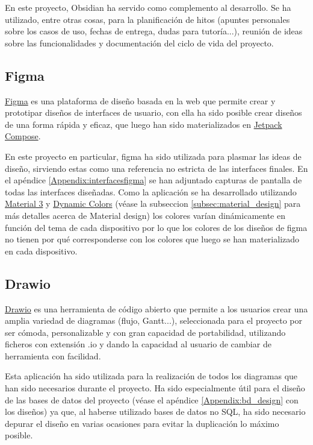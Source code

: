 En este proyecto, Obsidian ha servido como complemento al desarrollo. Se ha utilizado, entre otras cosas, para la planificación de hitos (apuntes personales sobre los casos de uso, fechas de entrega, dudas para tutoría...), reunión de ideas sobre las funcionalidades y documentación del ciclo de vida del proyecto.

\hypertarget{subsec:figma}{}
\subsection{Figma}
\href{https://www.figma.com}{Figma} es una plataforma de diseño basada en la web que permite crear y prototipar diseños de interfaces de usuario, con ella ha sido posible crear diseños de una forma rápida y eficaz, que luego han sido materializados en \hyperlink{subsec:compose}{Jetpack Compose}. 

En este proyecto en particular, figma ha sido utilizada para plasmar las ideas de diseño, sirviendo estas como una referencia no estricta de las interfaces finales. En el apéndice \ref{Appendix:interfacesfigma} se han adjuntado capturas de pantalla de todas las interfaces diseñadas. Como la aplicación se ha desarrollado utilizando \href{https://m3.material.io/}{Material 3} y \href{https://m3.material.io/styles/color/system/overview}{Dynamic Colors} (véase la subseccion \ref{subsec:material_design} para más detalles acerca de Material design) los colores varían dinámicamente en función del tema de cada dispositivo por lo que los colores de los diseños de figma no tienen por qué corresponderse con los colores que luego se han materializado en cada dispositivo.
\hypertarget{subsec:drawio}{}
\subsection{Drawio}
\href{https://www.drawio.com/}{Drawio} es una herramienta de código abierto que permite a los usuarios crear una amplia variedad de diagramas (flujo, Gantt...), seleccionada para el proyecto por ser cómoda, personalizable y con gran capacidad de portabilidad, utilizando ficheros con extensión .io y dando la capacidad al usuario de cambiar de herramienta con facilidad. 

Esta aplicación ha sido utilizada para la realización de todos los diagramas que han sido necesarios durante el proyecto. Ha sido especialmente útil para el diseño de las bases de datos del proyecto (véase el apéndice \ref{Appendix:bd_design} con los diseños) ya que, al haberse utilizado bases de datos no SQL, ha sido necesario depurar el diseño en varias ocasiones para evitar la duplicación lo máximo posible.

